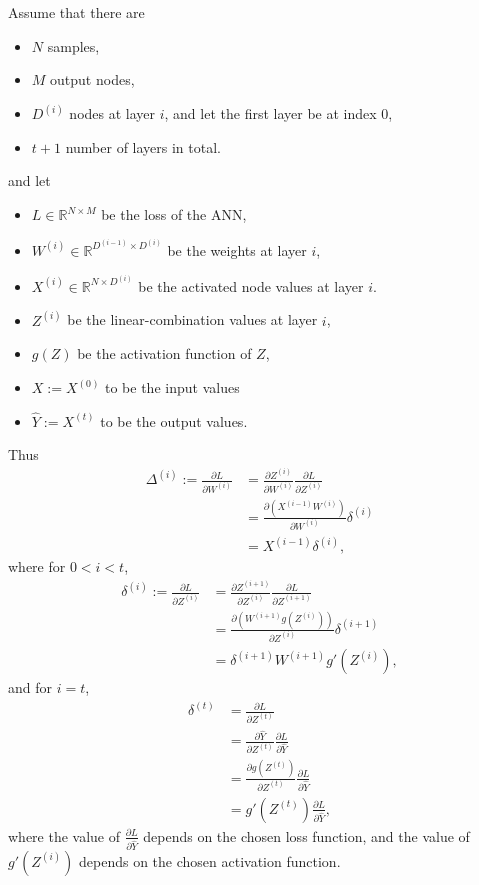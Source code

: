 \documentclass[twocolumn,landscape,10pt]{article}
\theoremstyle{definition}
\begin{document}
Assume that there are
\begin{itemize}
    \item $N$ samples,
    \item $M$ output nodes,
    \item $D^{(i)}$ nodes at layer $i$, and let the first layer be at index 0,
    \item $t + 1$ number of layers in total.
\end{itemize} 
and let
\begin{itemize}
    \item $L\in\mathbb{R}^{N\times M}$ be the loss of the ANN,
    \item $W^{(i)}\in\mathbb{R}^{D^{(i - 1)}\times D^{(i)}}$ be the weights at layer $i$,
    \item $X^{(i)}\in\mathbb{R}^{N\times D^{(i)}}$
        be the activated node values at layer $i$.
    \item $Z^{(i)}$ be the linear-combination values at layer $i$,
    \item $g(Z)$ be the activation function of $Z$,
    \item $X:=X^{(0)}$ to be the input values
    \item $\hat{Y}:=X^{(t)}$ to be the output values.
\end{itemize} 
Thus
\begin{align*}
    \Delta^{(i)}:=\frac{\partial L}{\partial W^{(i)}}
    & = \frac{\partial Z^{(i)}}{\partial W^{(i)}}\frac{\partial L}{\partial Z^{(i)}}\\
    & = \frac{\partial \left(X^{(i-1)}W^{(i)}\right)}{\partial W^{(i)}}\delta^{(i)}\\
    & = X^{(i-1)}\delta^{(i)},
\end{align*} 
where for $0 < i < t$,
\begin{align*}
    \delta^{(i)}:=\frac{\partial L}{\partial Z^{(i)}}
    & = \frac{\partial Z^{(i+1)}}{\partial Z^{(i)}}
    \frac{\partial L}{\partial Z^{(i + 1)}} \\
    & = \frac{\partial \left(W^{(i+1)}g(Z^{(i)})\right)}{\partial
    Z^{(i)}}\delta^{(i+1)}\\
    & = \delta^{(i+1)}W^{(i+1)}g'(Z^{(i)}),
\end{align*} 
and for $i = t$,
\begin{align*}
    \delta^{(t)}
    & = \frac{\partial L}{\partial Z^{(t)}} \\
    & = \frac{\partial \hat{Y}}{\partial Z^{(t)}}
    \frac{\partial L}{\partial \hat{Y}}\\
    & = \frac{\partial g(Z^{(t)})}{\partial Z^{(t)}}
    \frac{\partial L}{\partial \hat{Y}}\\
    & = g'(Z^{(t)}) \frac{\partial L}{\partial \hat{Y}},
\end{align*} 
where the value of $\frac{\partial L}{\partial \hat{Y}}$ depends on the chosen
loss function, and the value of $g'(Z^{(i)})$ depends on the chosen activation
function.
\end{document}
